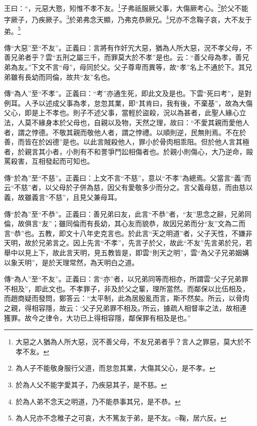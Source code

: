 王曰：“，元惡大憝，矧惟不孝不友。\footnote{大惡之人猶為人所大惡，況不善父母，不友兄弟者乎？言人之罪惡，莫大於不孝不友。}子弗祇服厥父事，大傷厥考心。\footnote{為人子不能敬身服行父道，而怠忽其業，大傷其父心，是不孝。}於父不能字厥子，乃疾厥子。\footnote{於為人父不能字愛其子，乃疾惡其子，是不慈。}於弟弗念天顯，乃弗克恭厥兄。\footnote{於為人弟不念天之明道，乃不能恭事其兄，是不恭。}兄亦不念鞠子哀，大不友于弟。\footnote{為人兄亦不念稚子之可哀，大不篤友于弟，是不友。○鞠，居六反。}


{\noindent\zhuan{}\fzbyks 傳“大惡”至“不友”。正義曰：言將有作奸宄大惡，猶為人所大惡，況不孝父母，不善兄弟者乎？雲“五刑之屬三千，而罪莫大於不孝”是也。云：“善父母為孝，善兄弟為友。”下文不言“母”，母同於父。父子尊卑而異等，故“孝”名上不通於下。其兄弟雖有長幼而同倫，故共“友”名也。 \par}

{\noindent\zhuan{}\fzbyks 傳“為人”至“不孝”。正義曰：“考”亦通生死，即此文及是也。下雲“死曰考”，是對例耳。人予以述成父事為孝，怠忽其業，即“其肯曰，我有後，不棄基”，故為大傷父心，即是上不孝也。則子不述父事，當輕於盜殺，況以為甚者，此聖人緣心立法，人莫不緣身本於父母也，自親以及物，天然之理，故曰：“不愛其親而愛他人者，謂之悖德。不敬其親而敬他人者，謂之悖禮。以順則逆，民無則焉。不在於善，而皆在於凶德”是也。以此言賊殺他人，罪小於骨肉相乖阻。但於他人言其極者，於親言其小者，小則有不和詈爭鬥訟相傷者也。於親小則傷心，大乃逆命，毆罵殺害，互相發起而可知也。 \par}

{\noindent\zhuan{}\fzbyks 傳“於為”至“不慈”。正義曰：上文不言“不慈”，意以“不孝”為總焉。父當言“義”而云“不慈”者，以父母於子併為慈，因父有愛敬多少而分之。言父義母慈，而由慈以義，故雖義言“不慈”，且見父兼母耳。 \par}

{\noindent\zhuan{}\fzbyks 傳“於為”至“不恭”。正義曰：善兄弟曰友，此言“不恭”者，“友”思念之辭，兄弟同倫，故俱言“友”；雖同倫而有長幼，其心友而貌恭，故因兄弟而分“友”文為二而言“恭”也。五教，即文十八年史克言也。於此言“天之明道”者，父子天性，不嫌非天明，故於兄弟言之。因上先言“不孝”，先言子於父，故此“不友”先言弟於兄，若舉中以見上下，故此言天明，見五教皆是，即雲“則天之明”，雲“為父子兄弟姻媾以象天明”，是於天理常然，為天明白之道。 \par}

{\noindent\zhuan{}\fzbyks 傳“為人”至“不友”。正義曰：言“亦”者，以兄弟同等而相亦，所謂雲“父子兄弟罪不相及”，即此文也。不孝罪子，非及於父之輩，理所當然。而鄰保以比伍相及，而趙商疑而發問，鄭答云：“太平制，此為居殷亂而言，斯不然矣。所云，以骨肉之親，得相容隱，故云：‘父子兄弟罪不相及。’所云，據疏人相督率之法，故相連獲罪。故今之律令，大功已上得相容隱，鄰保罪有相及是也。” \par}

